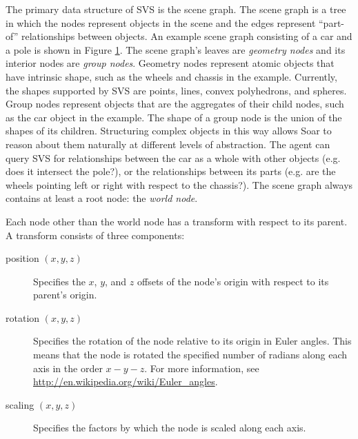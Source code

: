The primary data structure of SVS is the scene graph.
The scene graph is a tree in which the nodes represent objects in the scene and the edges represent ``part-of'' relationships between objects.
An example scene graph consisting of a car and a pole is shown in Figure \ref{fig:scene-graph}.
The scene graph's leaves are \emph{geometry nodes} and its interior nodes are \emph{group nodes}.
Geometry nodes represent atomic objects that have intrinsic shape, such as the wheels and chassis in the example.
Currently, the shapes supported by SVS are points, lines, convex polyhedrons, and spheres.
Group nodes represent objects that are the aggregates of their child nodes, such as the car object in the example.
The shape of a group node is the union of the shapes of its children.
Structuring complex objects in this way allows Soar to reason about them naturally at different levels of abstraction.
The agent can query SVS for relationships between the car as a whole with other objects (e.g. does it intersect the pole?), or the relationships between its parts (e.g. are the wheels pointing left or right with respect to the chassis?).
The scene graph always contains at least a root node: the \emph{world node}.

\begin{figure}
	\label{fig:scene-graph}
\end{figure}

Each node other than the world node has a transform with respect to its parent.
A transform consists of three components:

\vspace{-12pt}
\begin{description}
	\item[position $(x,y,z)$]
		Specifies the $x$, $y$, and $z$ offsets of the node's origin with respect to its parent's origin.
		\vspace{-6pt}
	\item[rotation $(x,y,z)$]
		Specifies the rotation of the node relative to its origin in Euler angles. This means that the node is rotated the specified number of radians along each axis in the order $x-y-z$. For more information, see \url{http://en.wikipedia.org/wiki/Euler_angles}.
		\vspace{-6pt}
	\item[scaling $(x,y,z)$]
		Specifies the factors by which the node is scaled along each axis.
		\vspace{-6pt}
\end{description}

